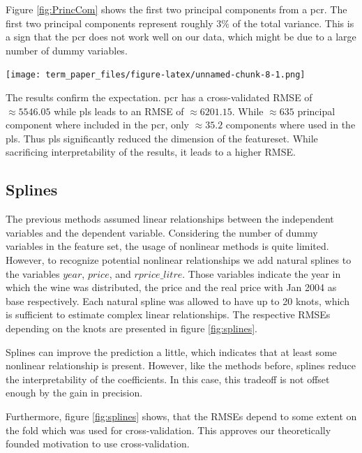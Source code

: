 \documentclass[11pt,]{article}
\let\origfigure\figure
\let\endorigfigure\endfigure
\renewenvironment{figure}[1][2] {
    \expandafter\origfigure\expandafter[H]
} {
    \endorigfigure
}
\begin{document}
Figure \ref{fig:PrincCom} shows the first two principal components from
a \ac{pcr}. The first two principal components represent roughly \(3\%\)
of the total variance. This is a sign that the \ac{pcr} does not work
well on our data, which might be due to a large number of dummy
variables.

\begin{figure}
\centering
\texttt{[image: term\_paper\_files/figure-latex/unnamed-chunk-8-1.png]}
\caption{\label{fig:PrincCom}Principal Component One and Two.}
\end{figure}

The results confirm the expectation. \ac{pcr} has a cross-validated
\ac{RMSE} of \(\approx 5546.05\) while \ac{pls} leads to an \ac{RMSE} of
\(\approx 6201.15\). While \(\approx 635\) principal component where
included in the \ac{pcr}, only \(\approx 35.2\) components where used in
the \ac{pls}. Thus \ac{pls} significantly reduced the dimension of the
featureset. While sacrificing interpretability of the results, it leads
to a higher \ac{RMSE}.

\hypertarget{splines}{%
\subsection{Splines}\label{splines}}

The previous methods assumed linear relationships between the
independent variables and the dependent variable. Considering the number
of dummy variables in the feature set, the usage of nonlinear methods is
quite limited. However, to recognize potential nonlinear relationships
we add natural splines to the variables \(year\), \(price\), and
\(rprice\_litre\). Those variables indicate the year in which the wine
was distributed, the price and the real price with Jan 2004 as base
respectively. Each natural spline was allowed to have up to 20 knots,
which is sufficient to estimate complex linear relationships. The
respective \ac{RMSE}s depending on the knots are presented in figure
\ref{fig:splines}.

Splines can improve the prediction a little, which indicates that at
least some nonlinear relationship is present. However, like the methods
before, splines reduce the interpretability of the coefficients. In this
case, this tradeoff is not offset enough by the gain in precision.

Furthermore, figure \ref{fig:splines} shows, that the \ac{RMSE}s depend
to some extent on the fold which was used for cross-validation. This
approves our theoretically founded motivation to use cross-validation.
\end{document}
